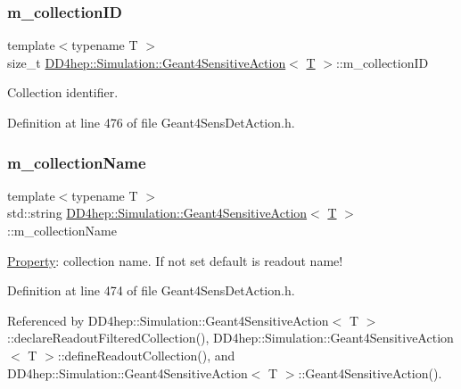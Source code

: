 \subsubsection{\texorpdfstring{m\+\_\+collection\+ID}{m\_collectionID}}
{\footnotesize\ttfamily template$<$typename T $>$ \\
size\+\_\+t \hyperlink{class_d_d4hep_1_1_simulation_1_1_geant4_sensitive_action}{D\+D4hep\+::\+Simulation\+::\+Geant4\+Sensitive\+Action}$<$ \hyperlink{class_t}{T} $>$\+::m\+\_\+collection\+ID\hspace{0.3cm}{\ttfamily [protected]}}



Collection identifier. 



Definition at line 476 of file Geant4\+Sens\+Det\+Action.\+h.

\hypertarget{class_d_d4hep_1_1_simulation_1_1_geant4_sensitive_action_a63934f5c71f72677f47b6666dbedba69}{}\label{class_d_d4hep_1_1_simulation_1_1_geant4_sensitive_action_a63934f5c71f72677f47b6666dbedba69} 
\subsubsection{\texorpdfstring{m\+\_\+collection\+Name}{m\_collectionName}}
{\footnotesize\ttfamily template$<$typename T $>$ \\
std\+::string \hyperlink{class_d_d4hep_1_1_simulation_1_1_geant4_sensitive_action}{D\+D4hep\+::\+Simulation\+::\+Geant4\+Sensitive\+Action}$<$ \hyperlink{class_t}{T} $>$\+::m\+\_\+collection\+Name\hspace{0.3cm}{\ttfamily [protected]}}



\hyperlink{class_d_d4hep_1_1_property}{Property}\+: collection name. If not set default is readout name! 



Definition at line 474 of file Geant4\+Sens\+Det\+Action.\+h.



Referenced by D\+D4hep\+::\+Simulation\+::\+Geant4\+Sensitive\+Action$<$ T $>$\+::declare\+Readout\+Filtered\+Collection(), D\+D4hep\+::\+Simulation\+::\+Geant4\+Sensitive\+Action$<$ T $>$\+::define\+Readout\+Collection(), and D\+D4hep\+::\+Simulation\+::\+Geant4\+Sensitive\+Action$<$ T $>$\+::\+Geant4\+Sensitive\+Action().

